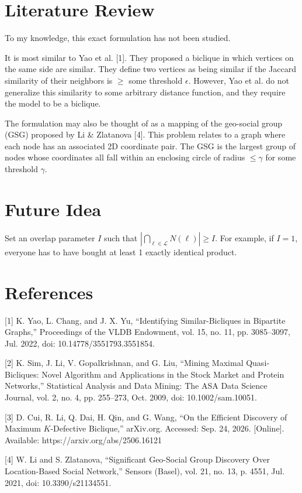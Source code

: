 \documentclass{article}
\begin{document}
\section{Literature Review}

To my knowledge, this exact formulation has not been studied.

It is most similar to Yao et al. [1]. They proposed a biclique in which vertices on the same side are similar. They define two vertices as being similar if the Jaccard similarity of their neighbors is $\geq$ some threshold $\epsilon$. However, Yao et al. do not generalize this similarity to some arbitrary distance function, and they require the model to be a biclique.

The formulation may also be thought of as a mapping of the geo-social group (GSG) proposed by Li \& Zlatanova [4]. This problem relates to a graph where each node has an associated 2D coordinate pair. The GSG is the largest group of nodes whose coordinates all fall within an enclosing circle of radius $\leq \gamma$ for some threshold $\gamma$.

\section{Future Idea}

Set an overlap parameter $I$ such that $|\bigcap_{\ell \in \mathcal{L}}N(\ell)| \geq I$. For example, if $I = 1$, everyone has to have bought at least 1 exactly identical product.

\section{References}

[1]
K. Yao, L. Chang, and J. X. Yu, “Identifying Similar-Bicliques in Bipartite Graphs,” Proceedings of the VLDB Endowment, vol. 15, no. 11, pp. 3085–3097, Jul. 2022, doi: 10.14778/3551793.3551854.

[2]
K. Sim, J. Li, V. Gopalkrishnan, and G. Liu, “Mining Maximal Quasi‐Bicliques: Novel Algorithm and Applications in the Stock Market and Protein Networks,” Statistical Analysis and Data Mining: The ASA Data Science Journal, vol. 2, no. 4, pp. 255–273, Oct. 2009, doi: 10.1002/sam.10051.

[3]
D. Cui, R. Li, Q. Dai, H. Qin, and G. Wang, “On the Efficient Discovery of Maximum $K$-Defective Biclique,” arXiv.org. Accessed: Sep. 24, 2026. [Online]. Available: https://arxiv.org/abs/2506.16121

[4]
W. Li and S. Zlatanova, “Significant Geo-Social Group Discovery Over Location-Based Social Network,” Sensors (Basel), vol. 21, no. 13, p. 4551, Jul. 2021, doi: 10.3390/s21134551.
\end{document}
